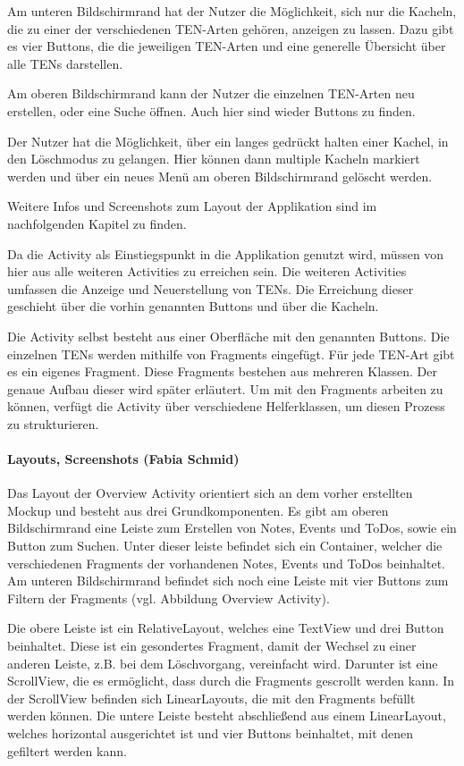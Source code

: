 Am unteren Bildschirmrand hat der Nutzer die Möglichkeit, sich nur die Kacheln, die zu einer der verschiedenen TEN-Arten gehören, anzeigen zu lassen. Dazu gibt es vier Buttons, die die jeweiligen TEN-Arten und eine generelle Übersicht über alle TENs darstellen.

Am oberen Bildschirmrand kann der Nutzer die einzelnen TEN-Arten neu erstellen, oder eine Suche öffnen. Auch hier sind wieder Buttons zu finden.

Der Nutzer hat die Möglichkeit, über ein langes gedrückt halten einer Kachel, in den Löschmodus zu gelangen. Hier können dann multiple Kacheln markiert werden und über ein neues Menü am oberen Bildschirmrand gelöscht werden.

Weitere Infos und Screenshots zum Layout der Applikation sind im nachfolgenden Kapitel zu finden.

Da die Activity als Einstiegspunkt in die Applikation genutzt wird, müssen von hier aus alle weiteren Activities zu erreichen sein. Die weiteren Activities umfassen die Anzeige und Neuerstellung von TENs. Die Erreichung dieser geschieht über die vorhin genannten Buttons und über die Kacheln.

Die Activity selbst besteht aus einer Oberfläche mit den genannten Buttons. Die einzelnen TENs werden mithilfe von Fragments eingefügt. Für jede TEN-Art gibt es ein eigenes Fragment. Diese Fragments bestehen aus mehreren Klassen. Der genaue Aufbau dieser wird später erläutert. Um mit den Fragments arbeiten zu können, verfügt die Activity über verschiedene Helferklassen, um diesen Prozess zu strukturieren.


\paragraph{Layouts, Screenshots (Fabia Schmid)}
Das Layout der Overview Activity orientiert sich an dem vorher erstellten Mockup und besteht aus drei Grundkomponenten. Es gibt am oberen Bildschirmrand eine Leiste zum Erstellen von Notes, Events und ToDos, sowie ein Button zum Suchen. Unter dieser leiste befindet sich ein Container, welcher die verschiedenen Fragments der vorhandenen Notes, Events und ToDos beinhaltet. Am unteren Bildschirmrand befindet sich noch eine Leiste mit vier Buttons zum Filtern der  Fragments (vgl. Abbildung Overview Activity).

Die obere Leiste ist ein RelativeLayout, welches eine TextView und drei Button beinhaltet. Diese ist ein gesondertes Fragment, damit der Wechsel zu einer anderen Leiste, z.B. bei dem Löschvorgang, vereinfacht wird. Darunter ist eine ScrollView, die es ermöglicht, dass durch die Fragments gescrollt werden kann. In der ScrollView befinden sich LinearLayouts, die mit den Fragments befüllt werden können. Die untere Leiste besteht abschließend aus einem LinearLayout, welches horizontal ausgerichtet ist und vier Buttons beinhaltet, mit denen gefiltert werden kann.

